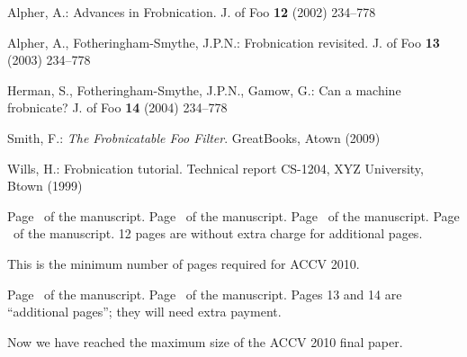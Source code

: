 \documentclass[runningheads]{llncs}
\begin{document}


\begin{thebibliography}{1}

Alpher, A.:
Advances in Frobnication.
J. of Foo 
\textbf{12} (2002)  234--778

Alpher, A., Fotheringham-Smythe, J.P.N.:
Frobnication revisited.
J. of Foo 
\textbf{13} (2003)  234--778

Herman, S., Fotheringham-Smythe, J.P.N., Gamow, G.:
Can a machine frobnicate?
J. of Foo 
\textbf{14} (2004)  234--778

Smith, F.:
{\it The Frobnicatable Foo Filter}.
GreatBooks, Atown (2009)

Wills, H.:
Frobnication tutorial.
Technical report CS-1204, XYZ University, Btown (1999)

\end{thebibliography}


\clearpage\mbox{}Page \thepage\ of the manuscript.
\clearpage\mbox{}Page \thepage\ of the manuscript.
\clearpage\mbox{}Page \thepage\ of the manuscript.
\clearpage\mbox{}Page \thepage\ of the manuscript.
12 pages are without extra charge for additional pages.
\par\vfill\par
This is the minimum number of pages required for ACCV 2010.

\clearpage\mbox{}Page \thepage\ of the manuscript.
\clearpage\mbox{}Page \thepage\ of the manuscript.
Pages 13 and 14 are ``additional pages''; they will need extra payment.
\par\vfill\par
Now we have reached the maximum size of the ACCV 2010 final paper.
\end{document}
